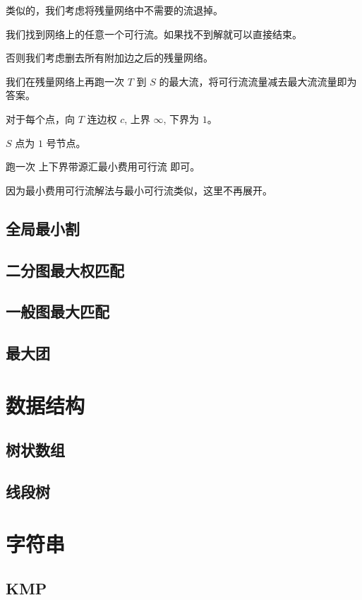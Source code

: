 \documentclass{article}
\begin{document}
类似的，我们考虑将残量网络中不需要的流退掉。

我们找到网络上的任意一个可行流。如果找不到解就可以直接结束。

否则我们考虑删去所有附加边之后的残量网络。

我们在残量网络上再跑一次 $T$ 到 $S$ 的最大流，将可行流流量减去最大流流量即为答案。


对于每个点，向 $T$ 连边权 $c$, 上界 $\infty$, 下界为 $1$。

$S$ 点为 $1$ 号节点。

跑一次 上下界带源汇最小费用可行流 即可。

因为最小费用可行流解法与最小可行流类似，这里不再展开。
\subsection{全局最小割}

\subsection{二分图最大权匹配}

\subsection{一般图最大匹配}

\subsection{最大团}


\section{数据结构}
\subsection{树状数组}

\subsection{线段树}

\section{字符串}
\subsection{KMP}

\end{document}
